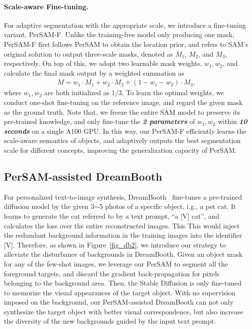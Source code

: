 \documentclass{article} \usepackage{iclr2024_conference,times}
\begin{document}
\paragraph{Scale-aware Fine-tuning.}
For adaptive segmentation with the appropriate scale, we introduce a fine-tuning variant, PerSAM-F. Unlike the training-free model only producing one mask, PerSAM-F first follows PerSAM to obtain the location prior, and refers to SAM's original solution to output three-scale masks, denoted as $M_1$, $M_2$, and $M_3$, respectively. On top of this, we adopt two learnable mask weights, $w_1, w_2$, and calculate the final mask output by a weighted summation as
\begin{align}
    M = w_1\cdot M_1 + w_2\cdot M_2 + (1-w_1-w_2)\cdot M_3,
\end{align}
where $w_1, w_2$ are both initialized as $1/3$. To learn the optimal weights, we conduct one-shot fine-tuning on the reference image, and regard the given mask as the ground truth.
Note that, we freeze the entire SAM model to preserve its pre-trained knowledge, and only fine-tune the \textbf{\textit{2 parameters}} of $w_1, w_2$ within \textbf{\textit{10 seconds}} on a single A100 GPU.
In this way, our PerSAM-F efficiently learns the scale-aware semantics of objects, and adaptively outputs the best segmentation scale for different concepts, improving the generalization capacity of PerSAM.




\subsection{PerSAM-assisted DreamBooth}
\label{s3.4}

For personalized text-to-image synthesis, DreamBooth~\citep{ruiz2022dreambooth} fine-tunes a pre-trained diffusion model by the given 3$\sim$5 photos of a specific object, i.g., a pet cat. It learns to generate the cat referred to by a text prompt, ``a [V] cat'', and calculates the loss over the entire reconstructed images. This 
This would inject the redundant background information in the training images into the identifier [V].
Therefore, as shown in Figure~\ref{fig_db2}, we introduce our strategy to alleviate the disturbance of backgrounds in DreamBooth.
Given an object mask for any of the few-shot images, we leverage our PerSAM to segment all the foreground targets, and discard the gradient back-propagation for pixels belonging to the background area. Then, the Stable Diffusion is only fine-tuned to memorize the visual appearances of the target object. With no supervision imposed on the background, our PerSAM-assisted DreamBooth can not only synthesize the target object with better visual correspondence, but also increase the diversity of the new backgrounds guided by the input text prompt.
\end{document}
